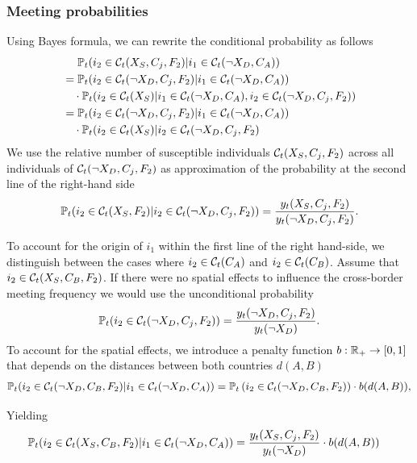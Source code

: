 \subsubsection{Meeting probabilities}
\label{A:meeting_prob}
Using Bayes formula, we can rewrite the conditional probability as follows
\begin{align}
\label{eq:cond_meeting_prob}
&\quad \   \mathbb{P}_t(i_2 \in \mathcal{C}_t(X_S, C_j, F_2)|i_1 \in \mathcal{C}_t(\neg X_D, C_A)) \\ &= \mathbb{P}_t(i_2 \in \mathcal{C}_t(\neg X_D, C_j, F_2) | i_1 \in \mathcal{C}_t(\neg X_D, C_A) )  \notag \\
& \quad \cdot \mathbb{P}_t(i_2 \in \mathcal{C}_t(X_S) | i_1 \in \mathcal{C}_t(\neg X_D, C_A), i_2 \in \mathcal{C}_t(\neg X_D, C_j, F_2) ) \notag \\
&= \mathbb{P}_t(i_2 \in \mathcal{C}_t(\neg X_D, C_j, F_2) | i_1 \in \mathcal{C}_t(\neg X_D, C_A) )  \notag \\
& \quad \cdot \mathbb{P}_t(i_2 \in \mathcal{C}_t(X_S)|i_2 \in \mathcal{C}_t(\neg X_D, C_j, F_2)  \notag
\end{align} 
We use the relative number of susceptible individuals $\mathcal{C}_t(X_S, C_j, F_2)$ across all individuals of $\mathcal{C}_t(\neg X_D, C_j, F_2)$ as approximation of the probability at the second line of the right-hand side 
\begin{align}
 \mathbb{P}_t(i_2 \in \mathcal{C}_t(X_S, F_2)|i_2 \in \mathcal{C}_t(\neg X_D, C_j, F_2) ) = \frac{y_t(X_S, C_j, F_2)}{y_t(\neg X_D, C_j, F_2)}.
\end{align}

To account for the origin of $i_1$ within the first line of the right hand-side, we distinguish between the cases where $i_2 \in \mathcal{C}_t(C_A)$ and $i_2 \in \mathcal{C}_t(C_B)$. Assume that $i_2 \in \mathcal{C}_t(X_S, C_B, F_2)$. If there were no spatial effects to influence the cross-border meeting frequency we would use the unconditional probability 
\begin{align}
\mathbb{P}_t(i_2 \in \mathcal{C}_t(\neg X_D, C_j, F_2)) = \frac{y_t(\neg X_D, C_j, F_2)}{ y_t(\neg X_D)}.   
\end{align}
To account for the spatial effects, we introduce a penalty function $b: \mathbb{R}_+ \to [0,1]$ that depends on the distances between both countries $d(A, B)$
\begin{align}
\label{eq:prob_cross_border}
\mathbb{P}_t(i_2 \in \mathcal{C}_t(\neg X_D, C_B, F_2) | i_1 \in \mathcal{C}_t(\neg X_D, C_A) ) = \mathbb{P}_t\left(i_2 \in \mathcal{C}_t(\neg X_D, C_B, F_2)\right) \cdot b(d(A, B)),
\end{align}

Yielding
\begin{align}
\label{eq:cond_meeting_prob_b}
\mathbb{P}_t(i_2 \in \mathcal{C}_t(X_S, C_B, F_2)|i_1 \in \mathcal{C}_t(\neg X_D, C_A)) &= \frac{y_t(X_S, C_j, F_2)}{y_t(\neg X_D)} \cdot b(d(A, B))
\end{align} 


